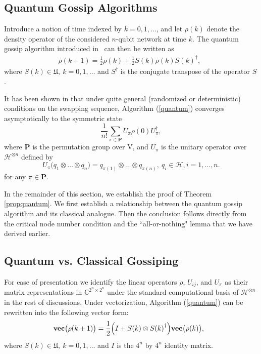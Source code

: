 \documentclass[a4paper, 11pt]{article}
\begin{document}
\subsection{Quantum Gossip Algorithms}

{Introduce a notion of time indexed by $k=0, 1, \dots$, and let $\rho(k)$ denote the density operator  of the considered $n$-qubit network at time $k$. The quantum gossip algorithm introduced in~\cite{Mazzarella2013a,Mazzarella2013b} can then be written as}
\begin{align}\label{quantum}
\rho(k+1)=\frac{1}{2} \rho(k)+ \frac{1}{2} S(k) \rho(k) S(k)^\dag,\ \
\end{align}
{where $ S(k)\in \mathfrak{U},\ k=0,1,\dots$ and $S^{\dag}$ is the conjugate transpose of the operator $S$.}

It has been shown in \cite{Mazzarella2013a,Mazzarella2013b} that under quite general (randomized or deterministic) conditions {on} the {swapping sequence}, Algorithm (\ref{quantum}) {converges} asymptotically to the  symmetric state
$$
\frac{1}{n!} \sum_{\pi \in \mathbf{P}} U_\pi \rho(0) U_\pi^\dag,
$$
where $\mathbf{P}$ is the permutation group over $\mathrm{V}$, and   $U_\pi$ is the  unitary operator over $\mathcal{H}^{\otimes n}$ defined  by
$$
U_\pi \big(q_1 \otimes \dots \otimes q_n\big)= q_{\pi(1)}\otimes \dots \otimes q_{\pi(n)},\  q_i\in \mathcal{H}, i=1,\dots,n.
$$
for any $\pi\in \mathbf{P}$.



 In the remainder of this section, we establish the proof of Theorem \ref{propquantum}. We first establish a relationship between the quantum gossip algorithm and its classical analogue. Then the conclusion follows directly from the critical node number condition and the ``all-or-nothing" lemma that we have derived earlier.
\subsection{Quantum  vs. Classical Gossiping}


For {ease} of presentation we identify the linear operators $\rho$, $U_{ij}$, and $U_\pi$ as their matrix representations in $\mathbb{C}^{2^n\times 2^n}$ under the standard computational basis of $\mathcal{H}^{\otimes n}$ in the rest of discussions. Under vectorization,   Algorithm (\ref{quantum}) can be rewritten  into the following vector form:
\begin{align}\label{vec}
{\rm \bf vec}\big(\rho(k+1)\big)=\frac{1}{2}\Big(I+ {S(k)}\otimes {S(k)}^\dag \Big) {\rm \bf vec}\big(\rho(k)\big),\ \
\end{align}
where $ {S(k)}\in \mathfrak{U},\ k=0,1,\dots$ and $I$ is the $4^n$ by $4^n$ identity matrix.
\end{document}
